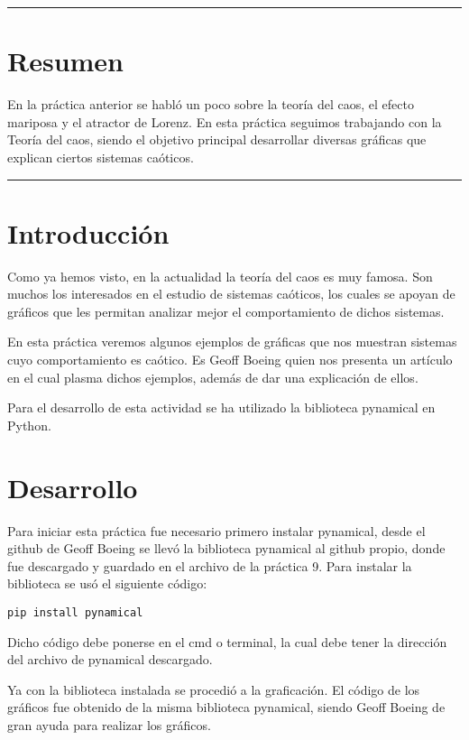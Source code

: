\documentclass[12pt]{article}
\begin{document}
\begin{doublespace}
\hrule
\section*{Resumen}
En la práctica anterior se habló un poco sobre la teoría del caos, el efecto mariposa y el atractor de Lorenz. En esta práctica seguimos trabajando con la Teoría del caos, siendo el objetivo principal desarrollar diversas gráficas que explican ciertos sistemas caóticos.
\vspace{0.6 cm}
\hrule

\vspace{0.6 cm}

\section{Introducción}

Como ya hemos visto, en la actualidad la teoría del caos es muy famosa. Son muchos los interesados en el estudio de sistemas caóticos, los cuales se apoyan de gráficos que les permitan analizar mejor el comportamiento de dichos sistemas.

En esta práctica veremos algunos ejemplos de gráficas que nos muestran sistemas cuyo comportamiento es caótico. Es Geoff Boeing quien nos presenta un artículo en el cual plasma dichos ejemplos, además de dar una explicación de ellos.

Para el desarrollo de esta actividad se ha utilizado la biblioteca pynamical en Python.

\section{Desarrollo}
Para iniciar esta práctica fue necesario primero instalar pynamical, desde el github de Geoff Boeing se llevó la biblioteca pynamical al github propio, donde fue descargado y guardado en el archivo de la práctica 9. Para instalar la biblioteca se usó el siguiente código: 

\begin{verbatim}
pip install pynamical
\end{verbatim}

Dicho código debe ponerse en el cmd o terminal, la cual debe tener la dirección del archivo de pynamical descargado.

Ya con la biblioteca instalada se procedió a la graficación. El código de los gráficos fue obtenido de la misma biblioteca pynamical, siendo Geoff Boeing de gran ayuda para realizar los gráficos. 


\end{doublespace}
\end{document}
